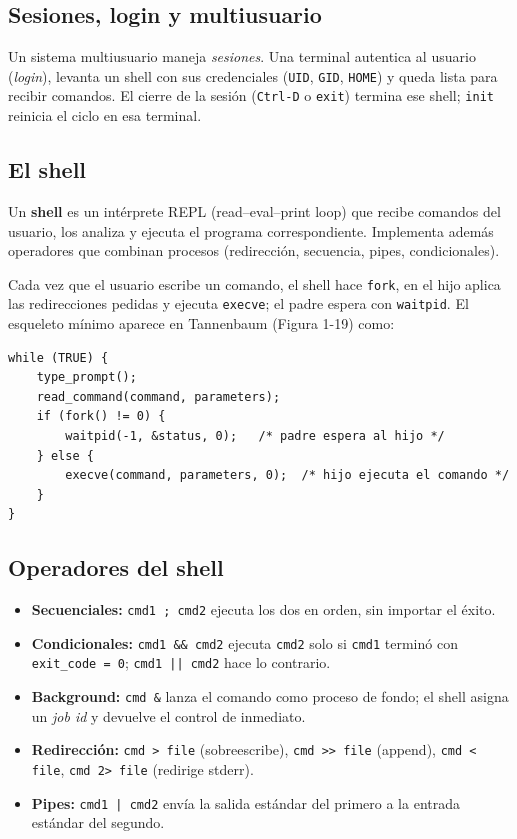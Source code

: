 \documentclass[11pt,a4paper]{article}
\begin{document}
\subsection{Sesiones, login y multiusuario}

Un sistema multiusuario maneja \emph{sesiones}. Una terminal autentica
al usuario (\emph{login}), levanta un shell con sus credenciales
(\texttt{UID}, \texttt{GID}, \texttt{HOME}) y queda lista para recibir
comandos. El cierre de la sesión (\texttt{Ctrl-D} o \texttt{exit})
termina ese shell; \texttt{init} reinicia el ciclo en esa terminal.

\subsection{El shell}

\begin{definicion}
Un \textbf{shell} es un intérprete REPL (read--eval--print loop) que
recibe comandos del usuario, los analiza y ejecuta el programa
correspondiente. Implementa además operadores que combinan procesos
(redirección, secuencia, pipes, condicionales).
\end{definicion}

Cada vez que el usuario escribe un comando, el shell hace
\texttt{fork}, en el hijo aplica las redirecciones pedidas y ejecuta
\texttt{execve}; el padre espera con \texttt{waitpid}. El esqueleto
mínimo aparece en Tannenbaum (Figura 1-19) como:

\begin{lstlisting}[style=cstyle]
while (TRUE) {
    type_prompt();
    read_command(command, parameters);
    if (fork() != 0) {
        waitpid(-1, &status, 0);   /* padre espera al hijo */
    } else {
        execve(command, parameters, 0);  /* hijo ejecuta el comando */
    }
}
\end{lstlisting}

\subsection{Operadores del shell}

\begin{itemize}[leftmargin=*]
    \item \textbf{Secuenciales:} \texttt{cmd1 ; cmd2} ejecuta los dos
        en orden, sin importar el éxito.
    \item \textbf{Condicionales:} \texttt{cmd1 \&\& cmd2} ejecuta
        \texttt{cmd2} solo si \texttt{cmd1} terminó con
        \texttt{exit\_code = 0}; \texttt{cmd1 || cmd2} hace lo
        contrario.
    \item \textbf{Background:} \texttt{cmd \&} lanza el comando como
        proceso de fondo; el shell asigna un \emph{job id} y devuelve
        el control de inmediato.
    \item \textbf{Redirección:} \texttt{cmd > file} (sobreescribe),
        \texttt{cmd >> file} (append), \texttt{cmd < file}, \texttt{cmd
        2> file} (redirige stderr).
    \item \textbf{Pipes:} \texttt{cmd1 | cmd2} envía la salida estándar
        del primero a la entrada estándar del segundo.
\end{itemize}
\end{document}
